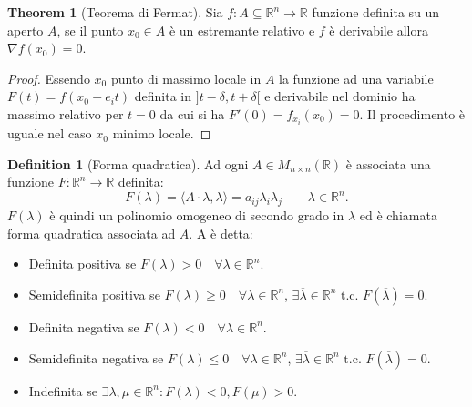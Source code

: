 \documentclass[leqno]{article}
\theoremstyle{definition}
\newtheorem{definition}{Definition}[section]
\numberwithin{equation}{section}
\newtheorem{theorem}{Theorem}[section]
\theoremstyle{remark}
\begin{document}
	\begin{theorem}[Teorema di Fermat]
		Sia $f:A\subseteq \mathbb{R}^n \rightarrow \mathbb{R}$ funzione definita su un aperto $A$, se il punto $x_0 \in A$ è un estremante relativo e $f$ è derivabile allora $\nabla f(x_0)=0$.
		
	\end{theorem}
	\begin{proof}
		Essendo $x_0$ punto di massimo locale in $A$ la funzione ad una variabile $F(t)=f(x_0+e_it)$ definita in $]t-\delta,t+\delta[$ e derivabile nel dominio ha massimo relativo per $t=0$ da cui si ha $F'(0)=f_{x_i}(x_0)=0$. Il procedimento è uguale nel caso $x_0$ minimo locale.
	\end{proof}
	\begin{definition}[Forma quadratica]
		Ad ogni $A \in M_{n \times n}(\mathbb{R})$ è associata una funzione $F:\mathbb{R}^n \rightarrow \mathbb{R}$ definita: 
		\begin{equation}
			F(\lambda)= \langle A \cdot \lambda , \lambda \rangle = a_{ij}\lambda_i \lambda_j \quad \quad \lambda \in \mathbb{R}^n.
		\end{equation} 
		$F(\lambda)$ è quindi un polinomio omogeneo di secondo grado in $\lambda$ ed è chiamata forma quadratica associata ad $A$. A è detta: 
		\begin{itemize}
			\item Definita positiva se $F(\lambda)>0 \quad \forall \lambda \in \mathbb{R}^n$.
			\item Semidefinita positiva se $F(\lambda) \ge 0 \quad \forall \lambda \in \mathbb{R}^n$, $\exists \overline{\lambda} \in \mathbb{R}^n \text{ t.c. } F(\overline{\lambda})=0$.
			\item Definita negativa se $F(\lambda)<0 \quad \forall \lambda \in \mathbb{R}^n$.
			\item Semidefinita negativa se $F(\lambda)\le 0 \quad \forall \lambda \in \mathbb{R}^n$, $\exists \overline{\lambda} \in \mathbb{R}^n \text{ t.c. } F(\overline{\lambda})=0$.
			\item Indefinita se $\exists \lambda, \mu \in \mathbb{R}^n : F(\lambda) < 0 , F(\mu) > 0$.
		\end{itemize}
	\end{definition}
	
\end{document}
